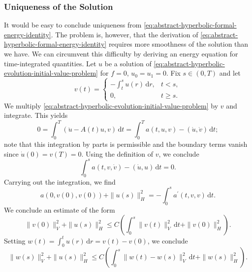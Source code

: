 \subsubsection{Uniqueness of the Solution}\label{subsec:hyperbolic-solution-uniqueness}

It would be easy to conclude uniqueness from \eqref{eq:abstract-hyperbolic-formal-energy-identity}. The problem is, however, that the derivation of \eqref{eq:abstract-hyperbolic-formal-energy-identity} requires more smoothness of the solution than we have. We can circumvent this difficulty by deriving an energy equation for time-integrated quantities. Let $u$ be a solution of \eqref{eq:abstract-hyperbolic-evolution-initial-value-problem} for $f=0$, $u_0=u_1=0$. Fix $s\in(0,T)$ and let
\begin{equation}\label{eq:abstract-hyperbolic-uniqueness-integrated-test-function}
v(t)=\begin{cases}-\int_t^s u(r)\,\mathrm{d}r,&t<s,\\0,&t\geq s.\end{cases}
\end{equation}
We multiply \eqref{eq:abstract-hyperbolic-evolution-initial-value-problem} by $v$ and integrate. This yields
\begin{equation}\label{eq:abstract-hyperbolic-uniqueness-integrated-zero-identity}
0=\int_0^T(\ddot u-A(t)u,v)\,\mathrm{d}t=\int_0^T a(t,u,v)-(\dot u,\dot v)\,\mathrm{d}t;
\end{equation}
note that this integration by parts is permissible and the boundary terms vanish since $\dot u(0)=v(T)=0$. Using the definition of $v$, we conclude
\begin{equation}\label{eq:abstract-hyperbolic-uniqueness-primitive-energy-pairing}
\int_0^s a(t,v,\dot v)-(\dot u,u)\,\mathrm{d}t=0.
\end{equation}
Carrying out the integration, we find
\begin{equation}\label{eq:abstract-hyperbolic-uniqueness-primitive-energy-identity}
a(0,v(0),v(0))+\|u(s)\|_H^2=-\int_0^s a^{\prime}(t,v,v)\,\mathrm{d}t.
\end{equation}
We conclude an estimate of the form
\begin{equation}\label{eq:abstract-hyperbolic-uniqueness-primitive-energy-bound}
\|v(0)\|_V^2+\|u(s)\|_H^2\leq C\left(\int_0^s\|v(t)\|_V^2\,\mathrm{d}t+\|v(0)\|_H^2\right).
\end{equation}
Setting $w(t)=\int_0^t u(r)\,\mathrm{d}r=v(t)-v(0)$, we conclude
\begin{equation}\label{eq:abstract-hyperbolic-uniqueness-zero-initial-primitive-bound}
\|w(s)\|_V^2+\|u(s)\|_H^2\leq C\left(\int_0^s\|w(t)-w(s)\|_V^2\,\mathrm{d}t+\|w(s)\|_H^2\right).
\end{equation}

